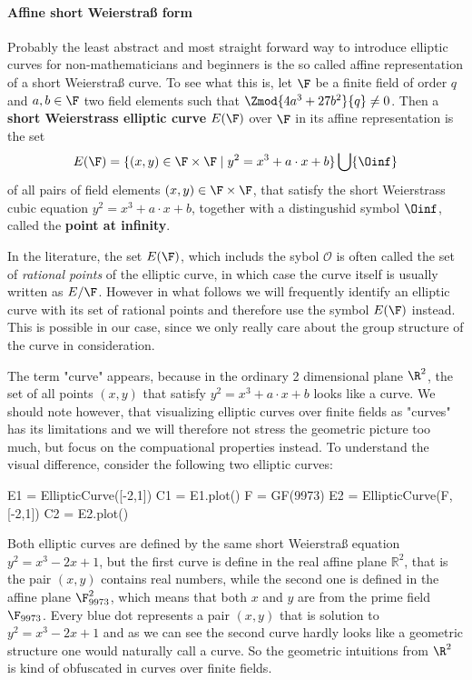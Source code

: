 \paragraph{Affine short Weierstraß form} Probably the least abstract and most straight forward way to introduce elliptic curves for non-mathematicians and beginners is the so called affine representation of a short Weierstraß curve. To see what this is, let $\F$ be a finite field of order $q$ and $a,b\in \F$ two field elements such that $\Zmod{4a^3+ 27b^2}{q}\neq 0$. Then a \textbf{short Weierstrass elliptic curve} $E(\F)$ over $\F$ in its affine representation is the set
\begin{equation}
\label{def_short_weierstrass_curve}
E(\F) = \{(x,y)\in \F\times \F\;|\; y^2=x^3+a\cdot x+b \} \bigcup \{\Oinf\}
\end{equation}
of all pairs of field elements $(x,y)\in \F\times \F$, that satisfy the short Weierstrass cubic equation $y^2=x^3+a\cdot x+b$, together with a distingushid symbol $\Oinf$, called the \textbf{point at infinity}.
\begin{notation}
In the literature, the set $E(\F)$, which includs the sybol $\mathcal{O}$ is often called the set of \textit{rational points} of the elliptic curve, in which case the curve itself is usually written as $E/\F$. However in what follows we will frequently identify an elliptic curve with its set of rational points and therefore use the symbol $E(\F)$ instead. This is possible in our case, since we only really care about the group structure of the curve in consideration.
\end{notation}
The term "curve" appears, because in the ordinary 2 dimensional plane $\R^2$,
the set of all points $(x,y)$ that satisfy $y^2 = x^3 +a\cdot x +b$ looks like a curve. We should note however, that visualizing elliptic curves over finite fields as "curves" has its limitations and we will therefore not stress the geometric picture too much, but focus on the compuational properties instead. To understand the visual difference, consider the following two elliptic curves: 
\begin{sagesilent}
E1 = EllipticCurve([-2,1])
C1 = E1.plot()
F = GF(9973)
E2 = EllipticCurve(F, [-2,1])
C2 = E2.plot()
\end{sagesilent}
\begin{center} 
\end{center}
Both elliptic curves are defined by the same short Weierstraß equation $y^2 = x^3-2x+1$, but the first curve is define in the real affine plane $\mathbb{R}^2$, that is the pair $(x,y)$ contains real numbers, while the second one is defined in the affine plane $\F_{9973}^2$, which means that both $x$ and $y$ are from the prime field $\F_{9973}$. Every blue dot represents a pair $(x,y)$ that is solution to $y^2 = x^3-2x+1$ and as we can see the second curve hardly looks like a geometric structure one would naturally call a curve. So the geometric intuitions from $\R^2$ is kind of obfuscated in curves over finite fields.

